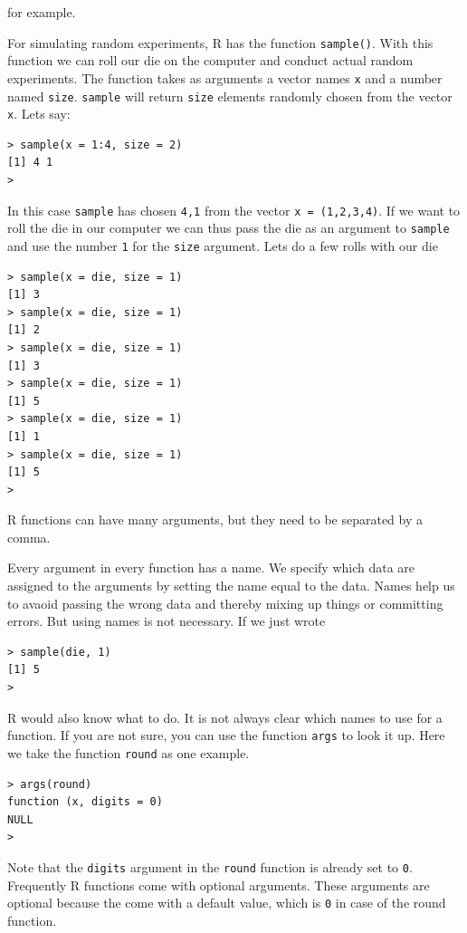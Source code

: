 \documentclass[
]{book}
\begin{document}
for example.

For simulating random experiments, R has the function \texttt{sample()}. With this function
we can roll our die on the computer and conduct actual random experiments. The function takes
as arguments a vector names \texttt{x} and a number named \texttt{size}. \texttt{sample} will return
\texttt{size} elements randomly chosen from the vector \texttt{x}. Lets say:

\begin{verbatim}
> sample(x = 1:4, size = 2)
[1] 4 1
> 
\end{verbatim}

In this case \texttt{sample} has chosen \texttt{4,1} from the vector \texttt{x\ =\ (1,2,3,4)}. If we want
to roll the die in our computer we can thus pass the die as an argument to \texttt{sample} and
use the number \texttt{1} for the \texttt{size} argument. Lets do a few rolls with our die

\begin{verbatim}
> sample(x = die, size = 1)
[1] 3
> sample(x = die, size = 1)
[1] 2
> sample(x = die, size = 1)
[1] 3
> sample(x = die, size = 1)
[1] 5
> sample(x = die, size = 1)
[1] 1
> sample(x = die, size = 1)
[1] 5
> 
\end{verbatim}

R functions can have many arguments, but they need to be separated by a comma.

Every argument in every function has a name. We specify which data are assigned to the
arguments by setting the name equal to the data. Names help us to avaoid passing the wrong
data and thereby mixing up things or committing errors. But using names is not
necessary. If we just wrote

\begin{verbatim}
> sample(die, 1)
[1] 5
> 
\end{verbatim}

R would also know what to do. It is not always clear which names to use for a function. If you are
not sure, you can use the function \texttt{args} to look it up. Here we take the
function \texttt{round} as one example.

\begin{verbatim}
> args(round)
function (x, digits = 0) 
NULL
> 
\end{verbatim}

Note that the \texttt{digits} argument in the \texttt{round} function is already set to \texttt{0}. Frequently
R functions come with optional arguments. These arguments are optional because the come with a
default value, which is \texttt{0} in case of the round function.
\end{document}

